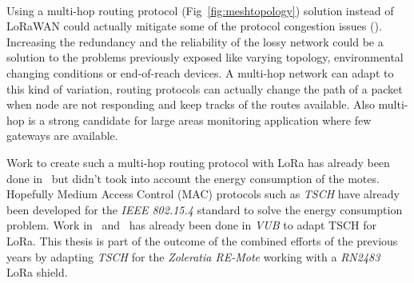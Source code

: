 


\paragraph{}


Using a multi-hop routing protocol (Fig~\ref{fig:meshtopology}) solution
instead of LoRaWAN could actually mitigate some of the protocol congestion
issues (\cite{8115756}).
Increasing the redundancy and the reliability of the lossy network could be a
solution to the problems previously exposed like varying topology,
environmental changing conditions or end-of-reach devices.
A multi-hop network can adapt to this kind of variation, routing protocols can
actually change the path of a packet when node are not responding and keep
tracks of the routes available. %
Also multi-hop is a strong candidate for large areas monitoring application
where few gateways are available.

Work to create such a multi-hop routing protocol with LoRa has already been
done in~\cite{8115756} but didn't took into account the energy consumption of
the motes.
Hopefully Medium Access Control (MAC) protocols such as \emph{TSCH} have
already been developed for the \emph{IEEE 802.15.4} standard to solve the
energy consumption problem.
Work in~\cite{8847137} and~\cite{njomgang_2018} has already been done in
\emph{VUB} to adapt TSCH for LoRa.
This thesis is part of the outcome of the combined efforts of the previous
years by adapting \emph{TSCH} for the \emph{Zoleratia RE-Mote} working with a
\emph{RN2483} LoRa shield.
